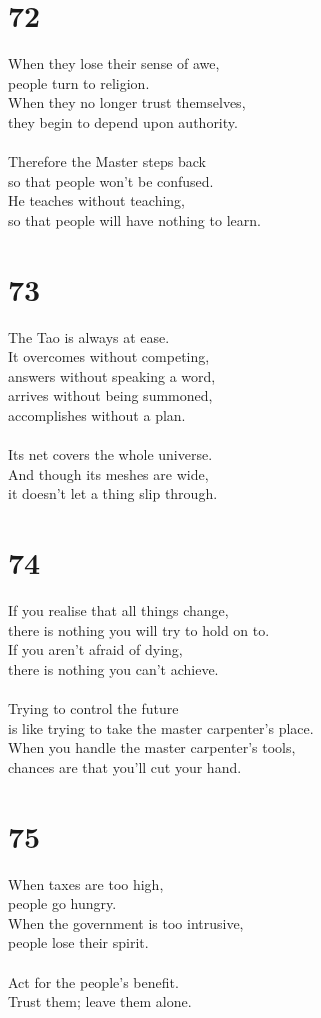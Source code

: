 \documentclass[b5paper, 12pt, oneside]{book}
\begin{document}
\chapter*{72}
When they lose their sense of awe,\\
people turn to religion.\\
When they no longer trust themselves,\\
they begin to depend upon authority.\\
\\
Therefore the Master steps back\\
so that people won't be confused.\\
He teaches without teaching,\\
so that people will have nothing to learn.

\chapter*{73}
The Tao is always at ease.\\
It overcomes without competing,\\
answers without speaking a word,\\
arrives without being summoned,\\
accomplishes without a plan.\\
\\
Its net covers the whole universe.\\
And though its meshes are wide,\\
it doesn't let a thing slip through.

\chapter*{74}
If you realise that all things change,\\
there is nothing you will try to hold on to.\\
If you aren't afraid of dying,\\
there is nothing you can't achieve.\\
\\
Trying to control the future\\
is like trying to take the master carpenter's place.\\
When you handle the master carpenter's tools,\\
chances are that you'll cut your hand.

\chapter*{75}
When taxes are too high,\\
people go hungry.\\
When the government is too intrusive,\\
people lose their spirit.\\
\\
Act for the people's benefit.\\
Trust them; leave them alone.
\end{document}
